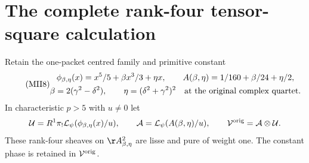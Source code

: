 \section{The complete rank-four tensor-square calculation}
Retain the one-packet centred family and primitive constant
\begin{equation}\tag{MII8}\label{mii:mii:quintic}
 \begin{gathered}
 \phi_{\beta,\eta}(x)=x^5/5+\beta x^3/3+\eta x,\qquad
 A(\beta,\eta)=1/160+\beta/24+\eta/2,\\
 \beta=2(\gamma^2-\delta^2),\qquad
 \eta=(\delta^2+\gamma^2)^2
 \quad\hbox{at the original complex quartet}.
 \end{gathered}
\end{equation}
In characteristic $p>5$ with $u\ne0$ let
\[
 \mathcal U=R^1\pi_!\mathcal L_\psi(\phi_{\beta,\eta}(x)/u),\qquad
 \mathcal A=\mathcal L_\psi(A(\beta,\eta)/u),\qquad
 \mathcal V^{\rm orig}=\mathcal A\otimes\mathcal U.
\]
These rank-four sheaves on $\AA^2_{\beta,\eta}$ are lisse and pure of
weight one. The constant phase is retained in $\mathcal V^{\rm orig}$.


